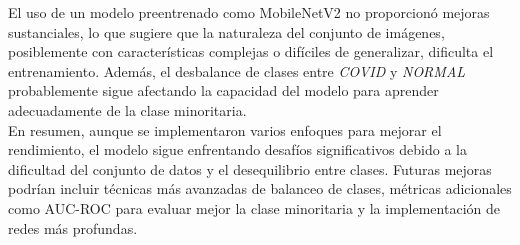 \documentclass{article}
\begin{document}
	El uso de un modelo preentrenado como MobileNetV2 no proporcionó mejoras sustanciales, lo que sugiere que la naturaleza del conjunto de imágenes, posiblemente con características complejas o difíciles de generalizar, dificulta el entrenamiento. Además, el desbalance de clases entre \textit{COVID} y \textit{NORMAL} probablemente sigue afectando la capacidad del modelo para aprender adecuadamente de la clase minoritaria.
	\\
	
	En resumen, aunque se implementaron varios enfoques para mejorar el rendimiento, el modelo sigue enfrentando desafíos significativos debido a la dificultad del conjunto de datos y el desequilibrio entre clases. Futuras mejoras podrían incluir técnicas más avanzadas de balanceo de clases, métricas adicionales como AUC-ROC para evaluar mejor la clase minoritaria y la implementación de redes más profundas.

\end{document}
